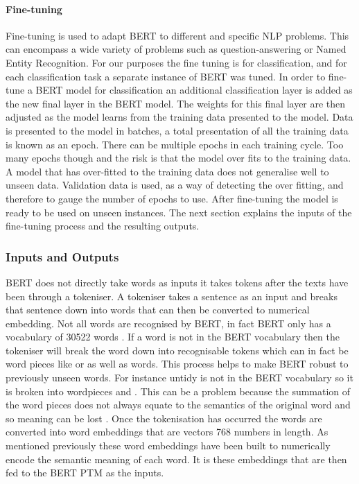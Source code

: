 \paragraph{Fine-tuning} Fine-tuning is used to adapt BERT to different and specific NLP problems. This can encompass a wide variety of problems such as question-answering or Named Entity Recognition. For our purposes the fine tuning is for classification, and for each classification task a separate instance of BERT was tuned. In order to fine-tune a BERT model for classification an additional classification layer is added as the new final layer in the BERT model. The weights for this final layer are then adjusted as the model learns from the training data presented to the model. Data is presented to the model in batches, a total presentation of all the training data is known as an epoch. There can be multiple epochs in each training cycle. Too many epochs though and the risk is that the model over fits to the training data. A model that has over-fitted to the training data does not generalise well to unseen data. Validation data is used, as a way of detecting the over fitting, and therefore to gauge the number of epochs to use. After fine-tuning the model is ready to be used on unseen instances. The next section explains the inputs of the fine-tuning process and the resulting outputs.

\subsubsection{Inputs and Outputs} BERT does not directly take words as inputs it takes tokens after the texts have been through a tokeniser. A tokeniser takes a sentence as an input and breaks that sentence down into words that can then be converted to numerical embedding. Not all words are recognised by BERT, in fact BERT only has a vocabulary of 30522 words \parencite{nayak-etal-2020-domain}. If a word is not in the BERT vocabulary then the tokeniser will break the word down into recognisable tokens which can in fact be word pieces like  or  as well as words. This process helps to make BERT robust to previously unseen words. For instance untidy is not in the BERT vocabulary so it is broken into wordpieces  and . This can be a problem because the summation of the word pieces does not always equate to the semantics of the original word and so meaning can be lost \parencite{nayak-etal-2020-domain}. Once the  tokenisation has occurred the words are converted into word embeddings that are vectors 768 numbers in length. As mentioned previously these word embeddings have been built to numerically encode the semantic meaning of each word. It is these embeddings that are then fed to the BERT PTM as the inputs.

